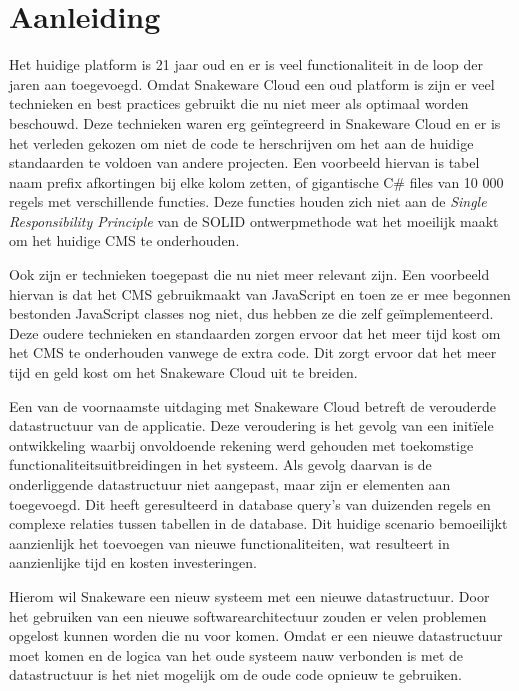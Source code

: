 \section{Aanleiding}
Het huidige platform is 21 jaar oud en er is veel functionaliteit in de loop der jaren aan toegevoegd.
Omdat Snakeware Cloud een oud platform is zijn er veel technieken en best practices gebruikt die nu niet meer als optimaal worden beschouwd.
Deze technieken waren erg geïntegreerd in Snakeware Cloud en er is het verleden gekozen om niet de code te herschrijven om het aan de huidige standaarden te voldoen van andere projecten.
Een voorbeeld hiervan is tabel naam prefix afkortingen bij elke kolom zetten, of gigantische C\# \Parencite{CSharp} files van 10 000 regels met verschillende functies.
Deze functies houden zich niet aan de \textit{Single Responsibility Principle} van de SOLID ontwerpmethode \Parencite{SOLID} wat het moeilijk maakt om het huidige \gls{CMS} te onderhouden.

\whitespace
Ook zijn er technieken toegepast die nu niet meer relevant zijn.
Een voorbeeld hiervan is dat het \gls{CMS} gebruikmaakt van JavaScript \Parencite{JavaScript} en toen ze er mee begonnen bestonden JavaScript classes \Parencite{JavascriptClasses} nog niet, dus hebben ze die zelf geïmplementeerd.
Deze oudere technieken en standaarden zorgen ervoor dat het meer tijd kost om het CMS te onderhouden vanwege de extra code.
Dit zorgt ervoor dat het meer tijd en geld kost om het Snakeware Cloud uit te breiden.

\whitespace[2]
Een van de voornaamste uitdaging met Snakeware Cloud betreft de verouderde datastructuur van de applicatie.
Deze veroudering is het gevolg van een initïele ontwikkeling waarbij onvoldoende rekening werd gehouden met toekomstige functionaliteitsuitbreidingen in het systeem.
Als gevolg daarvan is de onderliggende datastructuur niet aangepast, maar zijn er elementen aan toegevoegd.
Dit heeft geresulteerd in database query's van duizenden regels en complexe relaties tussen tabellen in de database.
Dit huidige scenario bemoeilijkt aanzienlijk het toevoegen van nieuwe functionaliteiten, wat resulteert in aanzienlijke tijd en kosten investeringen.

\newpage
\whitespace
Hierom wil Snakeware een nieuw systeem met een nieuwe datastructuur.
Door het gebruiken van een nieuwe softwarearchitectuur zouden er velen problemen opgelost kunnen worden die nu voor komen.
Omdat er een nieuwe datastructuur moet komen en de logica van het oude systeem nauw verbonden is met de datastructuur is het niet mogelijk om de oude code opnieuw te gebruiken.
